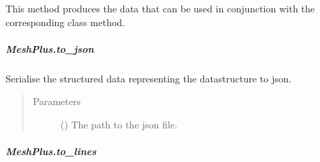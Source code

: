 \documentclass[letterpaper,10pt,english]{sphinxmanual}
\begin{document}
\begin{fulllineitems}
\begin{fulllineitems}
This method produces the data that can be used in conjunction with the
corresponding  class method.

\end{fulllineitems}



\subparagraph{MeshPlus.to\_json}
\label{\detokenize{api/generated/directional_clustering.mesh.MeshPlus.to_json:meshplus-to-json}}\label{\detokenize{api/generated/directional_clustering.mesh.MeshPlus.to_json::doc}}

\begin{fulllineitems}
\label{\detokenize{api/generated/directional_clustering.mesh.MeshPlus.to_json:directional_clustering.mesh.MeshPlus.to_json}}
Serialise the structured data representing the datastructure to json.
\begin{quote}\begin{description}
\item[{Parameters}] \leavevmode
{} () \textendash{} The path to the json file.

\end{description}\end{quote}

\end{fulllineitems}



\subparagraph{MeshPlus.to\_lines}
\label{\detokenize{api/generated/directional_clustering.mesh.MeshPlus.to_lines:meshplus-to-lines}}\label{\detokenize{api/generated/directional_clustering.mesh.MeshPlus.to_lines::doc}}

\begin{fulllineitems}
\label{\detokenize{api/generated/directional_clustering.mesh.MeshPlus.to_lines:directional_clustering.mesh.MeshPlus.to_lines}}
\end{fulllineitems}




\end{fulllineitems}
\end{document}
